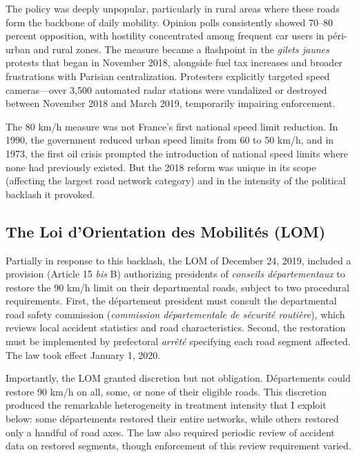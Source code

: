 \documentclass[12pt]{article}
\begin{document}
The policy was deeply unpopular, particularly in rural areas where these roads form the backbone of daily mobility. Opinion polls consistently showed 70--80 percent opposition, with hostility concentrated among frequent car users in p\'{e}ri-urban and rural zones. The measure became a flashpoint in the \textit{gilets jaunes} protests that began in November 2018, alongside fuel tax increases and broader frustrations with Parisian centralization. Protesters explicitly targeted speed cameras---over 3,500 automated radar stations were vandalized or destroyed between November 2018 and March 2019, temporarily impairing enforcement.

The 80 km/h measure was not France's first national speed limit reduction. In 1990, the government reduced urban speed limits from 60 to 50 km/h, and in 1973, the first oil crisis prompted the introduction of national speed limits where none had previously existed. But the 2018 reform was unique in its scope (affecting the largest road network category) and in the intensity of the political backlash it provoked.

\subsection{The Loi d'Orientation des Mobilit\'{e}s (LOM)}

Partially in response to this backlash, the LOM of December 24, 2019, included a provision (Article 15 \textit{bis} B) authorizing presidents of \textit{conseils d\'{e}partementaux} to restore the 90 km/h limit on their departmental roads, subject to two procedural requirements. First, the d\'{e}partement president must consult the departmental road safety commission (\textit{commission d\'{e}partementale de s\'{e}curit\'{e} routi\`{e}re}), which reviews local accident statistics and road characteristics. Second, the restoration must be implemented by prefectoral \textit{arr\^{e}t\'{e}} specifying each road segment affected. The law took effect January 1, 2020.

Importantly, the LOM granted discretion but not obligation. D\'{e}partements could restore 90 km/h on all, some, or none of their eligible roads. This discretion produced the remarkable heterogeneity in treatment intensity that I exploit below: some d\'{e}partements restored their entire networks, while others restored only a handful of road axes. The law also required periodic review of accident data on restored segments, though enforcement of this review requirement varied.
\end{document}
